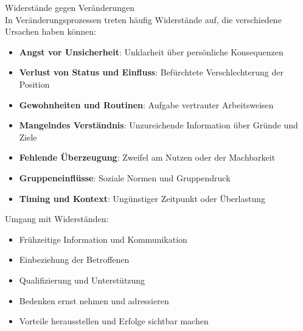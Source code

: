 \begin{concept}{Widerstände gegen Veränderungen}\\
In Veränderungsprozessen treten häufig Widerstände auf, die verschiedene Ursachen haben können:
\begin{itemize}
    \item \textbf{Angst vor Unsicherheit}: Unklarheit über persönliche Konsequenzen
    \item \textbf{Verlust von Status und Einfluss}: Befürchtete Verschlechterung der Position
    \item \textbf{Gewohnheiten und Routinen}: Aufgabe vertrauter Arbeitsweisen
    \item \textbf{Mangelndes Verständnis}: Unzureichende Information über Gründe und Ziele
    \item \textbf{Fehlende Überzeugung}: Zweifel am Nutzen oder der Machbarkeit
    \item \textbf{Gruppeneinflüsse}: Soziale Normen und Gruppendruck
    \item \textbf{Timing und Kontext}: Ungünstiger Zeitpunkt oder Überlastung
\end{itemize}

Umgang mit Widerständen:
\begin{itemize}
    \item Frühzeitige Information und Kommunikation
    \item Einbeziehung der Betroffenen
    \item Qualifizierung und Unterstützung
    \item Bedenken ernst nehmen und adressieren
    \item Vorteile herausstellen und Erfolge sichtbar machen
\end{itemize}
\end{concept}



